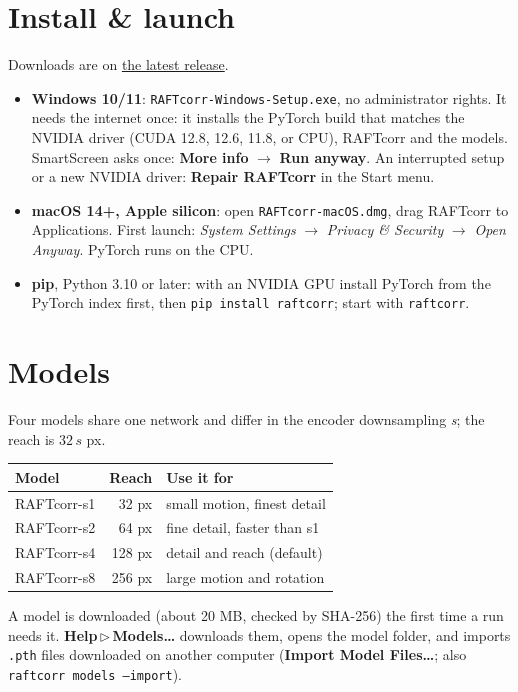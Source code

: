 \documentclass[10pt,letterpaper,twocolumn]{article}
\newcommand{\ui}[1]{\textbf{#1}}
\newcommand{\menu}[2]{\textbf{#1}\,$\triangleright$\,\textbf{#2}}
\newcommand{\file}[1]{\texttt{#1}}
\begin{document}

\section{Install \& launch}
Downloads are on \href{https://github.com/zachtong/RAFTcorr/releases/latest}{the latest release}.
\begin{itemize}
  \item \textbf{Windows 10/11}: \file{RAFTcorr-Windows-Setup.exe}, no administrator rights. It needs
        the internet once: it installs the PyTorch build that matches the NVIDIA driver (CUDA 12.8,
        12.6, 11.8, or CPU), RAFTcorr and the models. SmartScreen asks once: \ui{More info}
        $\to$ \ui{Run anyway}. An interrupted setup or a new NVIDIA driver: \ui{Repair RAFTcorr} in
        the Start menu.
  \item \textbf{macOS 14+, Apple silicon}: open \file{RAFTcorr-macOS.dmg}, drag RAFTcorr to
        Applications. First launch: \emph{System Settings} $\to$ \emph{Privacy \& Security} $\to$
        \emph{Open Anyway}. PyTorch runs on the CPU.
  \item \textbf{pip}, Python 3.10 or later: with an NVIDIA GPU install PyTorch from the PyTorch
        index first, then \file{pip install raftcorr}; start with \file{raftcorr}.
\end{itemize}

\section{Models}
Four models share one network and differ in the encoder downsampling \emph{s}; the reach is
\(32\,s\) px.
\begin{center}\small
\begin{tabular}{@{}lrl@{}}
\toprule
Model & Reach & Use it for \\
\midrule
RAFTcorr-s1 & 32 px & small motion, finest detail \\
RAFTcorr-s2 & 64 px & fine detail, faster than s1 \\
RAFTcorr-s4 & 128 px & detail and reach (default) \\
RAFTcorr-s8 & 256 px & large motion and rotation \\
\bottomrule
\end{tabular}
\end{center}
A model is downloaded (about 20 MB, checked by SHA-256) the first time a run needs it.
\menu{Help}{Models…} downloads them, opens the model folder, and imports \file{.pth} files
downloaded on another computer (\ui{Import Model Files…}; also \file{raftcorr models --import}).
\end{document}
